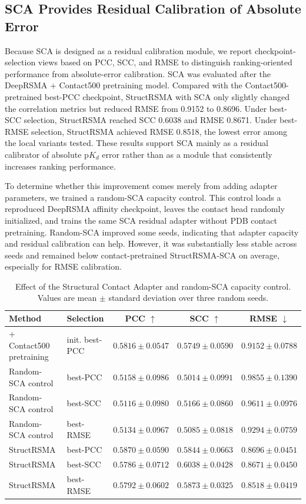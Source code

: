 ﻿\documentclass[journal=jcisd8,manuscript=article]{achemso}
\begin{document}
\subsection{SCA Provides Residual Calibration of Absolute Error}

Because SCA is designed as a residual calibration module, we report checkpoint-selection views based on PCC, SCC, and RMSE to distinguish ranking-oriented performance from absolute-error calibration. SCA was evaluated after the DeepRSMA + Contact500 pretraining model. Compared with the Contact500-pretrained best-PCC checkpoint, StructRSMA with SCA only slightly changed the correlation metrics but reduced RMSE from 0.9152 to 0.8696. Under best-SCC selection, StructRSMA reached SCC 0.6038 and RMSE 0.8671. Under best-RMSE selection, StructRSMA achieved RMSE 0.8518, the lowest error among the local variants tested. These results support SCA mainly as a residual calibrator of absolute p$K_d$ error rather than as a module that consistently increases ranking performance.

To determine whether this improvement comes merely from adding adapter parameters, we trained a random-SCA capacity control. This control loads a reproduced DeepRSMA affinity checkpoint, leaves the contact head randomly initialized, and trains the same SCA residual adapter without PDB contact pretraining. Random-SCA improved some seeds, indicating that adapter capacity and residual calibration can help. However, it was substantially less stable across seeds and remained below contact-pretrained StructRSMA-SCA on average, especially for RMSE calibration.

\begin{table}[t]
\centering
\caption{Effect of the Structural Contact Adapter and random-SCA capacity control. Values are mean $\pm$ standard deviation over three random seeds.}
\label{tab:sca_results}
\small
\setlength{\tabcolsep}{3pt}
\begin{tabular}{llccc}
\toprule
Method & Selection & PCC $\uparrow$ & SCC $\uparrow$ & RMSE $\downarrow$ \\
\midrule
+ Contact500 pretraining & init. best-PCC & $0.5816 \pm 0.0547$ & $0.5749 \pm 0.0590$ & $0.9152 \pm 0.0788$ \\
Random-SCA control & best-PCC & $0.5158 \pm 0.0986$ & $0.5014 \pm 0.0991$ & $0.9855 \pm 0.1390$ \\
Random-SCA control & best-SCC & $0.5116 \pm 0.0980$ & $0.5166 \pm 0.0860$ & $0.9611 \pm 0.0976$ \\
Random-SCA control & best-RMSE & $0.5134 \pm 0.0967$ & $0.5085 \pm 0.0818$ & $0.9294 \pm 0.0759$ \\
StructRSMA & best-PCC & $0.5870 \pm 0.0590$ & $0.5844 \pm 0.0663$ & $0.8696 \pm 0.0451$ \\
StructRSMA & best-SCC & $0.5786 \pm 0.0712$ & $0.6038 \pm 0.0428$ & $0.8671 \pm 0.0450$ \\
StructRSMA & best-RMSE & $0.5792 \pm 0.0602$ & $0.5873 \pm 0.0325$ & $0.8518 \pm 0.0419$ \\
\bottomrule
\end{tabular}
\end{table}
\end{document}
